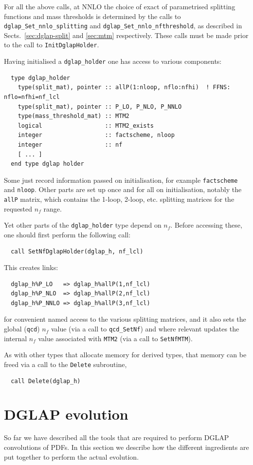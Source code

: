 \documentclass[12pt]{article}
\newcommand{\ttt}[1]{\texttt{#1}}
\begin{document}
For all the above calls, at NNLO the choice of exact of parametrised
splitting functions and mass thresholds is determined by the calls to
\ttt{dglap\_Set\_nnlo\_splitting} and
\ttt{dglap\_Set\_nnlo\_nfthreshold}, as described in
Sects.~\ref{sec:dglap-split} and \ref{sec:mtm} respectively. These
calls must be made prior to the call to \ttt{InitDglapHolder}.

Having initialised a \ttt{dglap\_holder} one has access to various components:
\begin{lstlisting}
  type dglap_holder
    type(split_mat), pointer :: allP(1:nloop, nflo:nfhi)  ! FFNS: nflo=nfhi=nf_lcl
    type(split_mat), pointer :: P_LO, P_NLO, P_NNLO
    type(mass_threshold_mat) :: MTM2
    logical                  :: MTM2_exists
    integer                  :: factscheme, nloop
    integer                  :: nf
    [ ... ]
  end type dglap holder
\end{lstlisting}
Some just record information passed on initialisation, for example
\ttt{factscheme} and \ttt{nloop}. Other parts are set up once and for
all on initialisation, notably the \ttt{allP} matrix, which contains
the 1-loop, 2-loop, etc. splitting matrices for the requested $n_f$
range.

Yet other parts of the \ttt{dglap\_holder} type depend on $n_f$.
Before accessing these, one should first perform the following call:
\begin{lstlisting}
  call SetNfDglapHolder(dglap_h, nf_lcl)
\end{lstlisting}
This creates links:
\begin{lstlisting}
  dglap_h%P_LO   => dglap_h%allP(1,nf_lcl)
  dglap_h%P_NLO  => dglap_h%allP(2,nf_lcl)
  dglap_h%P_NNLO => dglap_h%allP(3,nf_lcl)
\end{lstlisting}
for convenient named access to the various splitting matrices, and it
also sets the global (\ttt{qcd}) $n_f$ value (via a call to
\ttt{qcd\_SetNf}) and where relevant updates the internal $n_f$ value
associated with \ttt{MTM2} (via a call to \ttt{SetNfMTM}).

As with other types that allocate memory for derived types, that
memory can be freed via a call to the \ttt{Delete} subroutine,
\begin{lstlisting}
  call Delete(dglap_h)
\end{lstlisting}

\section{DGLAP evolution}
So far we have described all the tools that are required
to perform  DGLAP convolutions of PDFs. In this section
we describe how the different ingredients are put together
to perform the actual evolution.
\end{document}
